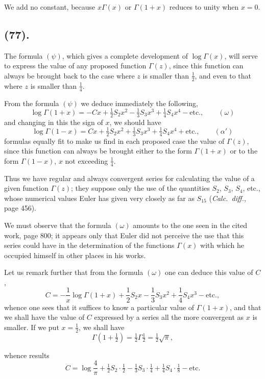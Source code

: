\documentclass{article}
\begin{document}
We add no constant, because $x\Gamma(x)$ or $\Gamma(1+x)$ reduces to unity when $x=0$.

\subsection*{(77).}

The formula $(\psi)$, which gives a complete development of $\log\Gamma(x)$, will serve to express the value of any proposed function $\Gamma(z)$, since this function can always be brought back to the case where $z$ is smaller than $\frac{1}{2}$, and even to that where $z$ is smaller than $\frac{1}{4}$.

From the formula $(\psi)$ we deduce immediately the following,
\[ \log\Gamma(1+x)=-Cx+\tfrac{1}{2}S_{2}x^{2}-\tfrac{1}{3}S_{3}x^{3}+\tfrac{1}{4}S_{4}x^{4}-\text{etc.},\qquad(\omega) \]
and changing in this the sign of $x$, we should have
\[ \log\Gamma(1-x)=Cx+\tfrac{1}{2}S_{2}x^{2}+\tfrac{1}{3}S_{3}x^{3}+\tfrac{1}{4}S_{4}x^{4}+\text{etc.},\qquad(\alpha') \]
formulas equally fit to make us find in each proposed case the value of $\Gamma(z)$, since this function can always be brought either to the form $\Gamma(1+x)$ or to the form $\Gamma(1-x)$, $x$ not exceeding $\frac{1}{4}$.

Thus we have regular and always convergent series for calculating the value of a given function $\Gamma(z)$; they suppose only the use of the quantities $S_{2}$, $S_{3}$, $S_{4}$, etc., whose numerical values Euler has given very closely as far as $S_{15}$ (\emph{Calc.\ diff.}, page 456).

We must observe that the formula $(\omega)$ amounts to the one seen in the cited work, page 800; it appears only that Euler did not perceive the use that this series could have in the determination of the functions $\Gamma(x)$ with which he occupied himself in other places in his works.

Let us remark further that from the formula $(\omega)$ one can deduce this value of $C$,
\[ C=-\frac{1}{x}\log\Gamma(1+x)+\frac{1}{2}S_{2}x-\frac{1}{3}S_{3}x^{2}+\frac{1}{4}S_{4}x^{3}-\text{etc.}, \]
whence one sees that it suffices to know a particular value of $\Gamma(1+x)$, and that we shall have the value of $C$ expressed by a series all the more convergent as $x$ is smaller. If we put $x=\frac{1}{2}$, we shall have
\[ \Gamma\left(1+\tfrac{1}{2}\right)=\tfrac{1}{2}\Gamma\tfrac{1}{2}=\tfrac{1}{2}\sqrt{\pi}, \]

whence results
\[ C=\log\frac{4}{\pi}+\tfrac{1}{2}S_{2}\cdot\tfrac{1}{2}-\tfrac{1}{3}S_{3}\cdot\tfrac{1}{4}+\tfrac{1}{4}S_{4}\cdot\tfrac{1}{8}-\text{etc.} \]
\end{document}
